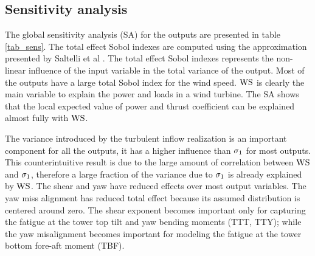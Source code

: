 \documentclass[preprint,12pt]{elsarticle}
\begin{document}
\subsection{Sensitivity analysis}

The global sensitivity analysis (SA) for the outputs are presented in table \ref{tab_sens}. The total effect Sobol indexes are computed using the approximation presented by Saltelli et al \cite{saltelli2010variance}. The total effect Sobol indexes represents the non-linear influence of the input variable in the total variance of the output. Most of the outputs have a large total Sobol index for the wind speed. $\text{WS}$ is clearly the main variable to explain the power and loads in a wind turbine. The SA shows that the local expected value of power and thrust coefficient can be explained almost fully with $\text{WS}$.

The variance introduced by the turbulent inflow realization is an important component for all the outputs, it has a higher influence than $\sigma_{1}$ for most outputs. This counterintuitive result is due to the large amount of correlation between $\text{WS}$ and $\sigma_{1}$, therefore a large fraction of the variance due to $\sigma_{1}$ is already explained by $\text{WS}$. The shear and yaw have reduced effects over most output variables. The yaw miss alignment has reduced total effect because its assumed distribution is centered around zero. The shear exponent becomes important only for capturing the fatigue at the tower top tilt and yaw bending moments (TTT, TTY); while the yaw misalignment becomes important for modeling the fatigue at the tower bottom fore-aft moment (TBF).
\end{document}
